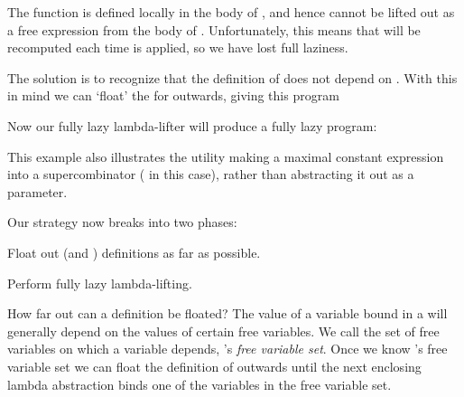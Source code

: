\noindent
The function  is defined locally in the body of , and hence  cannot
be lifted out as a free expression from the body of . Unfortunately, this means
that  will be recomputed each time  is applied, so we have lost full
laziness.

The solution is to recognize that the definition of  does not depend on .
With this in mind we can `float' the  for  outwards, giving this program


\noindent
Now our fully lazy lambda-lifter will produce a fully lazy program:


This example also illustrates the utility making a maximal constant
expression into a supercombinator ( in this case), rather than
abstracting it out as a parameter.

Our strategy now breaks into two phases:
\begin{numbered}
    \item Float out  (and ) definitions as far as possible.
    \item Perform fully lazy lambda-lifting.
\end{numbered}
How far out can a  definition be floated? The value of a variable bound in
a  will generally depend on the values of certain free variables. We call
the set of free variables on which a variable  depends, 's \textit{free variable set}.
Once we know 's free variable set we can float the definition of  outwards
until the next enclosing lambda abstraction binds one of the variables in the
free variable set.

